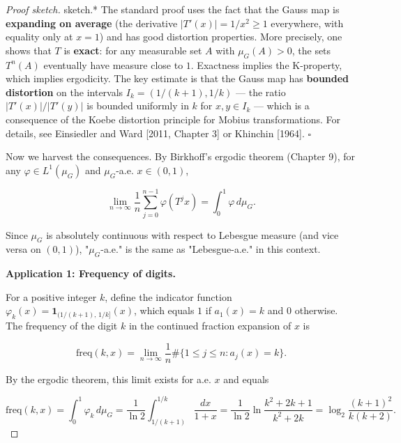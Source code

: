 \begin{proof}[Proof sketch]
sketch.* The standard proof uses the fact that the Gauss map is \textbf{expanding on average} (the derivative $|T'(x)| = 1/x^2 \geq 1$ everywhere, with equality only at $x = 1$) and has good distortion properties. More precisely, one shows that $T$ is \textbf{exact}: for any measurable set $A$ with $\mu_G(A) > 0$, the sets $T^n(A)$ eventually have measure close to $1$. Exactness implies the K-property, which implies ergodicity. The key estimate is that the Gauss map has \textbf{bounded distortion} on the intervals $I_k = (1/(k+1), 1/k)$ --- the ratio $|T'(x)|/|T'(y)|$ is bounded uniformly in $k$ for $x, y \in I_k$ --- which is a consequence of the Koebe distortion principle for Mobius transformations. For details, see Einsiedler and Ward [2011, Chapter 3] or Khinchin [1964]. $\square$

Now we harvest the consequences. By Birkhoff's ergodic theorem (Chapter 9), for any $\varphi \in L^1(\mu_G)$ and $\mu_G$-a.e. $x \in (0,1)$,

\[
\lim_{n \to \infty} \frac{1}{n} \sum_{j=0}^{n-1} \varphi(T^j x) = \int_0^1 \varphi \, d\mu_G.
\]

Since $\mu_G$ is absolutely continuous with respect to Lebesgue measure (and vice versa on $(0,1)$), "$\mu_G$-a.e." is the same as "Lebesgue-a.e." in this context.

\textbf{Application 1: Frequency of digits.}

For a positive integer $k$, define the indicator function $\varphi_k(x) = \mathbf{1}_{(1/(k+1), \, 1/k]}(x)$, which equals $1$ if $a_1(x) = k$ and $0$ otherwise. The frequency of the digit $k$ in the continued fraction expansion of $x$ is

\[
\text{freq}(k, x) = \lim_{n \to \infty} \frac{1}{n} \#\{1 \leq j \leq n : a_j(x) = k\}.
\]

By the ergodic theorem, this limit exists for a.e. $x$ and equals

\[
\text{freq}(k, x) = \int_0^1 \varphi_k \, d\mu_G = \frac{1}{\ln 2} \int_{1/(k+1)}^{1/k} \frac{dx}{1+x} = \frac{1}{\ln 2} \ln \frac{k^2 + 2k + 1}{k^2 + 2k} = \log_2 \frac{(k+1)^2}{k(k+2)}.
\]

\end{proof}

